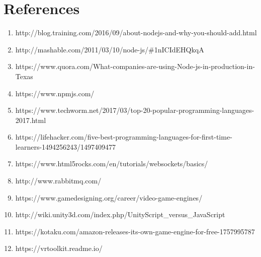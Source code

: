 \documentclass[onecolumn, draftclsnofoot,10pt, compsoc]{IEEEtran}
\begin{document}
\section{References}
    \begin{enumerate}
        \item http://blog.training.com/2016/09/about-nodejs-and-why-you-should-add.html
        \item http://mashable.com/2011/03/10/node-js/\#1nICIdEHQkqA

        \item https://www.quora.com/What-companies-are-using-Node-js-in-production-in-Texas
        \item https://www.npmjs.com/
        \item https://www.techworm.net/2017/03/top-20-popular-programming-languages-2017.html
        \item https://lifehacker.com/five-best-programming-languages-for-first-time-learners-1494256243/1497409477
        \item https://www.html5rocks.com/en/tutorials/websockets/basics/
        \item http://www.rabbitmq.com/

        \item https://www.gamedesigning.org/career/video-game-engines/
        \item http://wiki.unity3d.com/index.php/UnityScript\_versus\_JavaScript
        
        \item https://kotaku.com/amazon-releases-its-own-game-engine-for-free-1757995787
        \item https://vrtoolkit.readme.io/
    \end{enumerate}
\end{document}
